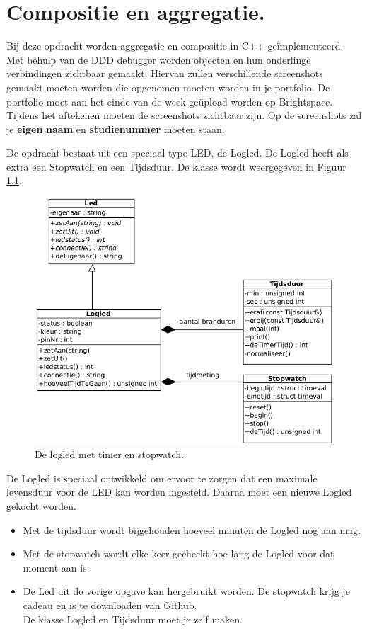 \chapter{Compositie en aggregatie.} 
\label{ch:hfstCompAgg}
Bij deze opdracht worden aggregatie en compositie in C++ geïmplementeerd. Met behulp van de DDD debugger worden objecten en hun onderlinge verbindingen zichtbaar gemaakt. Hiervan zullen verschillende screenshots gemaakt moeten worden die opgenomen  moeten worden in je portfolio. De portfolio moet aan het einde van de week geüpload worden op Brightspace. Tijdens het aftekenen moeten de screenshots zichtbaar zijn. Op de screenshots zal je \textbf{eigen} \textcolor{BrickRed}{\textbf{naam}} en \textcolor{BrickRed}{\textbf{studienummer}} moeten staan.

De opdracht bestaat uit een speciaal type LED, de Logled. De Logled heeft als extra een Stopwatch en een Tijdsduur. De klasse wordt weergegeven in Figuur \ref{fig:logled}.
    \begin{figure}[h!]
	\captionsetup{justification=centering}
	\includegraphics[width=0.9 \linewidth]{figuren/logled}      %
\centering
\caption{De logled met timer en stopwatch.}
\label{fig:logled}
\end{figure} 
De Logled is speciaal ontwikkeld om ervoor te zorgen dat een maximale levensduur voor de LED kan worden ingesteld. Daarna moet een nieuwe Logled gekocht worden. 
\begin{itemize}
	\item Met de tijdsduur wordt bijgehouden hoeveel minuten de Logled nog aan mag. 
	\item Met de stopwatch wordt elke keer gecheckt hoe lang de Logled voor dat moment aan is.
	\item De Led uit de vorige opgave kan hergebruikt worden. De stopwatch krijg je cadeau en is te downloaden van Github. \\De klasse Logled en Tijdsduur moet je zelf maken.
\end{itemize}

